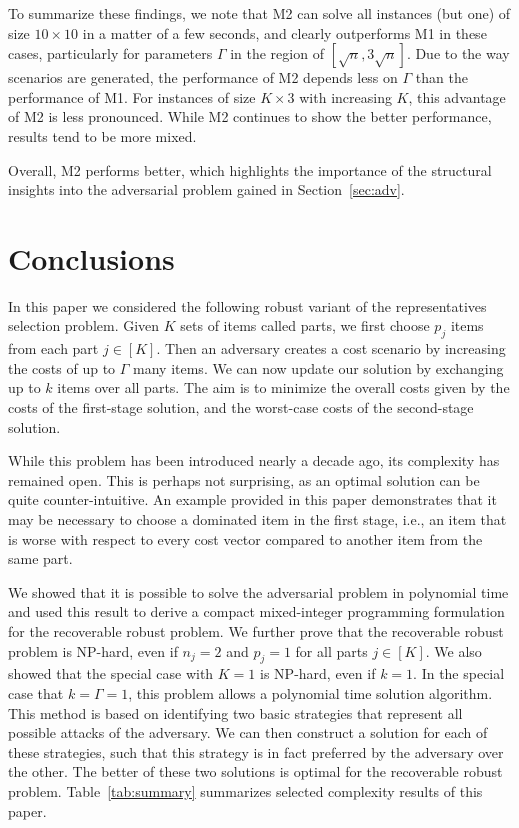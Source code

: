 To summarize these findings, we note that M2 can solve all instances (but one) of size $10\times 10$ in a matter of a few seconds, and clearly outperforms M1 in these cases, particularly for parameters $\Gamma$ in the region of $[\sqrt{n},3\sqrt{n}]$. Due to the way scenarios are generated, the performance of M2 depends less on $\Gamma$ than the performance of M1. For instances of size $K \times 3$ with increasing $K$, this advantage of M2 is less pronounced. While M2 continues to show the better performance, results tend to be more mixed.

Overall, M2 performs better, which highlights the importance of the structural insights into the adversarial problem gained in Section~\ref{sec:adv}.

\section{Conclusions}
\label{sec:conclusions}

In this paper we considered the following robust variant of the representatives selection problem. Given $K$ sets of items called parts, we first choose $p_j$ items from each part $j\in[K]$. Then an adversary creates a cost scenario by increasing the costs of up to $\Gamma$ many items. We can now update our solution by exchanging up to $k$ items over all parts. The aim is to minimize the overall costs given by the costs of the first-stage solution, and the worst-case costs of the second-stage solution.

While this problem has been introduced nearly a decade ago, its complexity has remained open. This is perhaps not surprising, as an optimal solution can be quite counter-intuitive. An example provided in this paper demonstrates that it may be necessary to choose a dominated item in the first stage, i.e., an item that is worse with respect to every cost vector compared to another item from the same part.

We showed that it is possible to solve the adversarial problem in polynomial time and used this result to derive a compact mixed-integer programming formulation for the recoverable robust problem. We further prove that the recoverable robust problem is NP-hard, even if $n_j=2$ and $p_j=1$ for all parts $j\in[K]$. We also showed that the special case with $K=1$ is NP-hard, even if $k=1$. In the special case that $k=\Gamma=1$, this problem allows a polynomial time solution algorithm. This method is based on identifying two basic strategies that represent all possible attacks of the adversary. We can then construct a solution for each of these strategies, such that this strategy is in fact preferred by the adversary over the other. The better of these two solutions is optimal for the recoverable robust problem. Table~\ref{tab:summary} summarizes selected complexity results of this paper.

